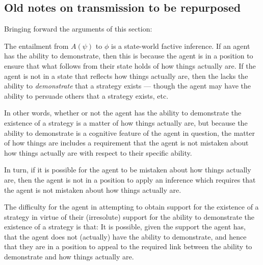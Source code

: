 \documentclass[10pt]{article}
\begin{document}
\newpage

\subsection{Old notes on transmission to be repurposed}
\label{sec:old-notes-transm}

\begin{note}
  Bringing forward the arguments of this section:

  The entailment from \(A(\psi)\) to \(\phi\) is a state-world factive inference.
  If an agent has the ability to demonstrate, then this is because the agent is in a position to ensure that what follows from their state holds of how things actually are.
  If the agent is not in a state that reflects how things actually are, then the lacks the ability to \emph{demonstrate} that a strategy exists --- though the agent may have the ability to persuade others that a strategy exists, etc.

  In other words, whether or not the agent has the ability to demonstrate the existence of a strategy is a matter of how things actually are, but because the ability to demonstrate is a cognitive feature of the agent in question, the matter of how things are includes a requirement that the agent is not mistaken about how things actually are with respect to their specific ability.

  In turn, if it is possible for the agent to be mistaken about how things actually are, then the agent is not in a position to apply an inference which requires that the agent is not mistaken about how things actually are.

  The difficulty for the agent in attempting to obtain support for the existence of a strategy in virtue of their (irresolute) support for the ability to demonstrate the existence of a strategy is that:
  It is possible, given the support the agent has, that the agent does not (actually) have the ability to demonstrate, and hence that they are in a position to appeal to the required link between the ability to demonstrate and how things actually are.
\end{note}
\end{document}

